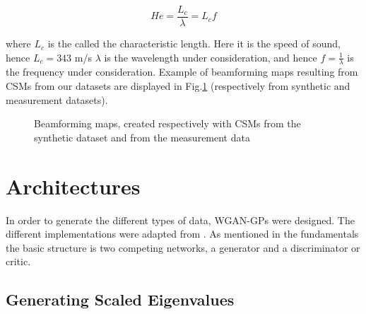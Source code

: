\documentclass[11pt,a4paper,twoside]{report}
\begin{document}
\begin{equation}
    He = \frac{L_c}{\lambda} = L_c f 
\end{equation}

where $L_c$ is the called the characteristic length. Here it is the speed of sound, hence $L_c = 343$ m/s $\lambda$ is the wavelength under consideration, and hence $f = \frac{1}{\lambda}$ is the frequency under consideration. Example of beamforming maps resulting from CSMs from our datasets are displayed in Fig.\ref{fig:datasets_beamforming_example} (respectively from synthetic and measurement datasets).

\begin{figure}
    \centering
    \caption{Beamforming maps, created respectively with CSMs from the synthetic dataset and from the measurement data}
    \label{fig:datasets_beamforming_example}    
\end{figure}

\section{Architectures}

In order to generate the different types of data, WGAN-GPs were designed. The different implementations were adapted from \cite{nain2020wgangp}. As mentioned in the fundamentals the basic structure is two competing networks, a generator and a discriminator or critic.

\subsection{Generating Scaled Eigenvalues}
\end{document}
